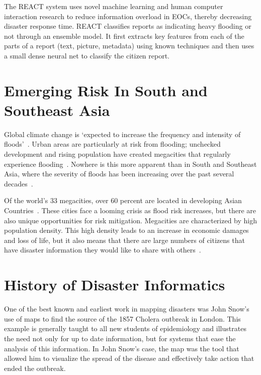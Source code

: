 The REACT system uses novel machine learning and human computer interaction
research to reduce information overload in EOCs, thereby decreasing disaster
response time. REACT classifies reports as indicating heavy flooding or not
through an ensemble model. It first extracts key features from each of the parts
of a report (text, picture, metadata) using known techniques and then uses a
small dense neural net to classify the citizen report.

\section{Emerging Risk In South and Southeast Asia} Global climate change is
`expected to increase the frequency and intensity of
floods'~\cite{ahernGlobalHealthImpacts2005}.  Urban areas are particularly at
risk from flooding; unchecked development and rising population have created
megacities that regularly experience flooding~\cite{chanFloodRiskAsia2012}.
Nowhere is this more apparent than in South and Southeast Asia, where the
severity of floods has been increasing over the past several
decades~\cite{tortiFloodsSoutheastAsia2012}.

Of the world's 33 megacities, over 60 percent are located in developing Asian
Countries~\cite{unitednationsdepartmentofeconomicandsocialaffairsWorldCities20162016}.
These cities face a looming crisis as flood risk increases, but there are also
unique opportunities for risk mitigation. Megacities are characterized by high
population density. This high density leads to an increase in economic damages
and loss of life, but it also means that there are large numbers of citizens
that have disaster information they would like to share with
others~\cite{chanFloodRiskAsia2012}.

\section{History of Disaster Informatics} One of the best known and earliest
work in mapping disasters was John Snow's use of maps to find the
source of the 1857 Cholera outbreak in London\cite{rogersJohnSnowData2013}. This
example is generally taught to all new students of epidemiology and illustrates
the need not only for up to date information, but for systems that ease the
analysis of this information. In John Snow's case, the map was the tool that
allowed him to visualize the spread of the disease and effectively take action
that ended the outbreak.

